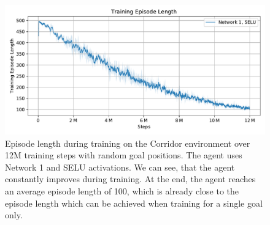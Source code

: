 \begin{figure}[htp]
    \begin{center}
        \includegraphics[clip, width=0.95\columnwidth]{figures/evaluation/randomness/goals/maze0318_episode_length_final.pdf}
    \end{center}
    \caption[Episode Length using Random Goal Positions on the Corridor Environment]{Episode length during training on the Corridor environment over 12M training steps with random goal positions. The agent uses Network 1 and SELU activations. We can see, that the agent constantly improves during training. At the end, the agent reaches an average episode length of 100, which is already close to the episode length which can be achieved when training for a single goal only.} \label{fig:Eval/RandomGoal/Maze0318}
\end{figure}

